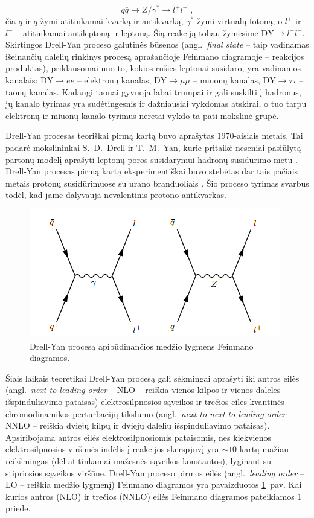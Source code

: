 \documentclass[a4paper, 12pt, oneside]{article}
\newcommand{\DYee}{\mathrm{DY} \! \rightarrow \! ee}
\newcommand{\DYmumu}{\mathrm{DY} \! \rightarrow \! \mu\mu}
\newcommand{\DYtau}{\mathrm{DY} \! \rightarrow \! \tau\tau}
\newcommand{\DY}{\mathrm{DY}}
\newlength\q
\begin{document}
\begin{equation*}
	q\bar{q} \rightarrow Z/ \gamma^{*} \rightarrow l^{+}l^{-} \; ,
\end{equation*}
čia $q$ ir $\bar{q}$ žymi atitinkamai kvarką ir antikvarką, $\gamma^*$ žymi virtualų fotoną, o $l^+$ ir $l^-$ -- atitinkamai
antileptoną ir leptoną.
Šią reakciją toliau žymėsime $\DY \! \rightarrow \! l^{+}l^{-}$.
Skirtingos Drell-Yan proceso galutinės būsenos (angl.\ \textit{final state} -- taip vadinamas išeinančių dalelių rinkinys
procesą aprašančioje Feinmano diagramoje -- reakcijos produktas), priklausomai nuo to, kokios rūšies leptonai susidaro, yra
vadinamos kanalais: $\DYee$ -- elektronų kanalas, $\DYmumu$ -- miuonų kanalas, $\DYtau$ -- taonų kanalas.
Kadangi taonai gyvuoja labai trumpai ir gali suskilti į hadronus, jų kanalo tyrimas yra sudėtingesnis ir dažniausiai vykdomas atskirai,
o tuo tarpu elektronų ir miuonų kanalo tyrimus neretai vykdo ta pati mokslinė grupė.

Drell-Yan procesas teoriškai pirmą kartą buvo aprašytas $1970$-aisiais metais.
Tai padarė mokslininkai S.~D.~Drell ir T.~M.~Yan, kurie pritaikė neseniai pasiūlytą partonų modelį aprašyti
leptonų poros susidarymui hadronų susidūrimo metu \cite{DYoriginal}.
Drell-Yan procesas pirmą kartą eksperimentiškai buvo stebėtas dar tais pačiais metais protonų susidūrimuose
su urano branduoliais \cite{DY_firstExp}.
Šio proceso tyrimas svarbus todėl, kad jame dalyvauja nevalentinis protono antikvarkas.

\begin{figure}[b]
\centering
\includegraphics[scale=0.75]{DYprocess.PNG}
\caption{Drell-Yan procesą apibūdinančios medžio lygmens Feinmano diagramos.}
\label{fig:DYfeyn}
\end{figure}

Šiais laikais teoretikai Drell-Yan procesą gali sėkmingai aprašyti iki antros eilės (angl.\ \textit{next-to-leading order} -- NLO --
reiškia vienos kilpos ir vienos dalelės išspinduliavimo pataisas) elektrosilpnosios sąveikos
ir trečios eilės kvantinės chromodinamikos perturbacijų tikslumo (angl.\ \textit{next-to-next-to-leading order} -- NNLO --
reiškia dviejų kilpų ir dviejų dalelių išspinduliavimo pataisas).
Apsiribojama antros eilės elektrosilpnosiomis pataisomis, nes kiekvienos elektrosilpnosios viršūnės indėlis į reakcijos skerspjūvį
yra $\sim\!10$ kartų mažiau reikšmingas (dėl atitinkamai mažesnės sąveikos konstantos), lyginant su stipriosios sąveikos viršūne.
Drell-Yan proceso pirmos eilės (angl.\ \textit{leading order} -- LO -- reiškia medžio lygmenį) Feinmano diagramos
yra pavaizduotos \ref{fig:DYfeyn}~pav.
Kai kurios antros (NLO) ir trečios (NNLO) eilės Feinmano diagramos pateikiamos 1 priede.
\end{document}

